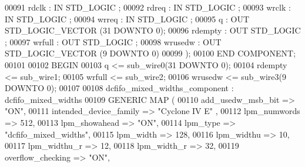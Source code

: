 \begin{DoxyCode}
{00091             rdclk   : \textcolor{keywordflow}{IN} \textcolor{comment}{STD\_LOGIC} ;
00092             rdreq   : \textcolor{keywordflow}{IN} \textcolor{comment}{STD\_LOGIC} ;
00093             wrclk   : \textcolor{keywordflow}{IN} \textcolor{comment}{STD\_LOGIC} ;
00094             wrreq   : \textcolor{keywordflow}{IN} \textcolor{comment}{STD\_LOGIC} ;
00095             q   : \textcolor{keywordflow}{OUT} \textcolor{comment}{STD\_LOGIC\_VECTOR} (\textcolor{vhdllogic}{}\textcolor{vhdllogic}{31} \textcolor{keywordflow}{DOWNTO} \textcolor{vhdllogic}{}\textcolor{vhdllogic}{0});
00096             rdempty : \textcolor{keywordflow}{OUT} \textcolor{comment}{STD\_LOGIC} ;
00097             wrfull  : \textcolor{keywordflow}{OUT} \textcolor{comment}{STD\_LOGIC} ;
00098             wrusedw : \textcolor{keywordflow}{OUT} \textcolor{comment}{STD\_LOGIC\_VECTOR} (\textcolor{vhdllogic}{}\textcolor{vhdllogic}{9} \textcolor{keywordflow}{DOWNTO} \textcolor{vhdllogic}{}\textcolor{vhdllogic}{0})
00099     );
00100     \textcolor{keywordflow}{END} \textcolor{keywordflow}{COMPONENT};
00101 
00102 \textcolor{vhdlkeyword}{BEGIN}
00103     \textcolor{vhdlchar}{q}    \textcolor{vhdlchar}{<=} \textcolor{vhdlchar}{sub_wire0}\textcolor{vhdlchar}{(}\textcolor{vhdllogic}{}\textcolor{vhdllogic}{31} \textcolor{keywordflow}{DOWNTO} \textcolor{vhdllogic}{}\textcolor{vhdllogic}{0}\textcolor{vhdlchar}{)};
00104     \textcolor{vhdlchar}{rdempty}    \textcolor{vhdlchar}{<=} \textcolor{vhdlchar}{sub_wire1};
00105     \textcolor{vhdlchar}{wrfull}    \textcolor{vhdlchar}{<=} \textcolor{vhdlchar}{sub_wire2};
00106     \textcolor{vhdlchar}{wrusedw}    \textcolor{vhdlchar}{<=} \textcolor{vhdlchar}{sub_wire3}\textcolor{vhdlchar}{(}\textcolor{vhdllogic}{}\textcolor{vhdllogic}{9} \textcolor{keywordflow}{DOWNTO} \textcolor{vhdllogic}{}\textcolor{vhdllogic}{0}\textcolor{vhdlchar}{)};
00107 
00108     dcfifo_mixed_widths_component : dcfifo\_mixed\_widths
00109     \textcolor{keywordflow}{GENERIC} \textcolor{keywordflow}{MAP} (
00110         add\_usedw\_msb\_bit => \textcolor{keyword}{"ON"},
00111         intended\_device\_family => \textcolor{keyword}{"Cyclone IV E"}  ,
00112         lpm\_numwords => \textcolor{vhdllogic}{512},
00113         lpm\_showahead => \textcolor{keyword}{"ON"},
00114         lpm\_type => \textcolor{keyword}{"dcfifo\_mixed\_widths"},
00115         lpm\_width => \textcolor{vhdllogic}{128},
00116         lpm\_widthu => \textcolor{vhdllogic}{10},
00117         lpm\_widthu\_r => \textcolor{vhdllogic}{12},
00118         lpm\_width\_r => \textcolor{vhdllogic}{32},
00119         overflow\_checking => \textcolor{keyword}{"ON"},
}
\end{DoxyCode}
